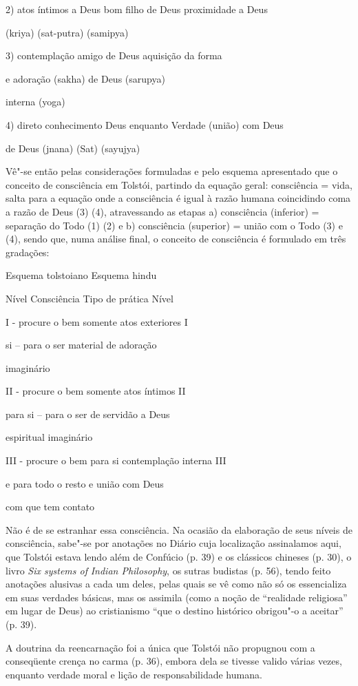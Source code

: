 2) atos íntimos a Deus bom filho de Deus proximidade a Deus

(kriya) (sat-putra) (samipya)

3) contemplação amigo de Deus aquisição da forma

e adoração (sakha) de Deus (sarupya)

interna (yoga)

4) direto conhecimento Deus enquanto Verdade (união) com Deus

de Deus (jnana) (Sat) (sayujya)

Vê"-se então pelas considerações formuladas e pelo esquema apresentado
que o conceito de consciência em Tolstói, partindo da equação geral:
consciência = vida, salta para a equação onde a consciência é igual à
razão humana coincidindo coma a razão de Deus (3) (4), atravessando as
etapas a) consciência (inferior) = separação do Todo (1) (2) e b)
consciência (superior) = união com o Todo (3) e (4), sendo que, numa
análise final, o conceito de consciência é formulado em três gradações:

{Esquema tolstoiano} {Esquema hindu}

Nível Consciência Tipo de prática Nível

I - procure o bem somente atos exteriores I

si -- para o ser material de adoração

imaginário

II - procure o bem somente atos íntimos II

para si -- para o ser de servidão a Deus

espiritual imaginário

III - procure o bem para si contemplação interna III

e para todo o resto e união com Deus

com que tem contato

Não é de se estranhar essa consciência. Na ocasião da elaboração de seus
níveis de consciência, sabe"-se por anotações no Diário cuja localização
assinalamos aqui, que Tolstói estava lendo além de Confúcio (p. 39) e os
clássicos chineses (p. 30), o livro \emph{Six systems of} \emph{Indian
Philosophy}, os sutras budistas (p. 56), tendo feito anotações alusivas
a cada um deles, pelas quais se vê como não só os essencializa em suas
verdades básicas, mas os assimila (como a noção de ``realidade
religiosa'' em lugar de Deus) ao cristianismo ``que o destino histórico
obrigou"-o a aceitar'' (p. 39).

A doutrina da reencarnação foi a única que Tolstói não propugnou com a
conseqüente crença no carma (p. 36), embora dela se tivesse valido
várias vezes, enquanto verdade moral e lição de responsabilidade humana.

